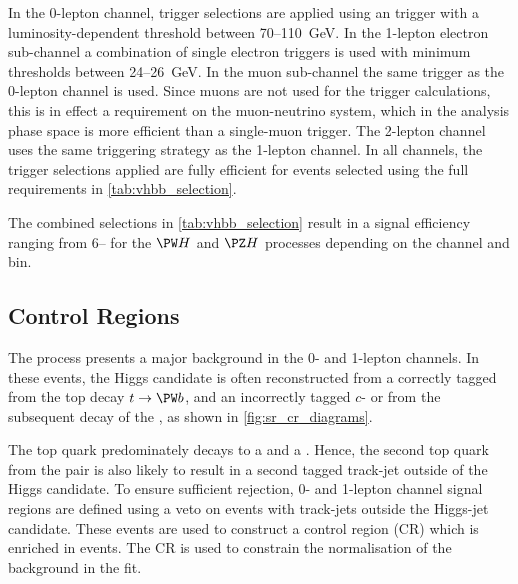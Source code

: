 In the 0-lepton channel, trigger selections are applied using an \ETmiss trigger with a luminosity-dependent threshold between 70--\SI{110}{\GeV}.
In the 1-lepton electron sub-channel a combination of single electron triggers is used with minimum \pt thresholds between 24--\SI{26}{\GeV}.
In the muon sub-channel the same \ETmiss trigger as the 0-lepton channel is used.
Since muons are not used for the \ETmiss trigger calculations, this is in effect a \pt requirement on the muon-neutrino system, which in the analysis phase space is more efficient than a single-muon trigger.
The 2-lepton channel uses the same triggering strategy as the 1-lepton channel.
In all channels, the trigger selections applied are fully efficient for events selected using the full requirements in \cref{tab:vhbb_selection}.

The combined selections in \cref{tab:vhbb_selection} result in a signal efficiency ranging from 6-- for the $\Wboson\higgs$ and $\Zboson\higgs$ processes depending on the channel and \ptv bin.

%

%

\subsection{Control Regions}\label{sec:vhbb_control_region}


The \ttbar process presents a major background in the 0- and 1-lepton channels.
In these events, the Higgs candidate is often reconstructed from a correctly tagged \bjet from the top decay $t \to \Wboson b$, and an incorrectly tagged $c$- or \ljet from the subsequent decay of the \Wboson, as shown in \cref{fig:sr_cr_diagrams}.

The top quark predominately decays to a \Wboson and a \bquark.
Hence, the second top quark from the \ttbar pair is also likely to result in a second tagged \btagged track-jet outside of the \largeR Higgs candidate.
To ensure sufficient \ttbar rejection, 0- and 1-lepton channel signal regions are defined using a veto on events with \btagged track-jets outside the Higgs-jet candidate.
These events are used to construct a control region (CR) which is enriched in \ttbar events.
The CR is used to constrain the normalisation of the \ttbar background in the fit.

